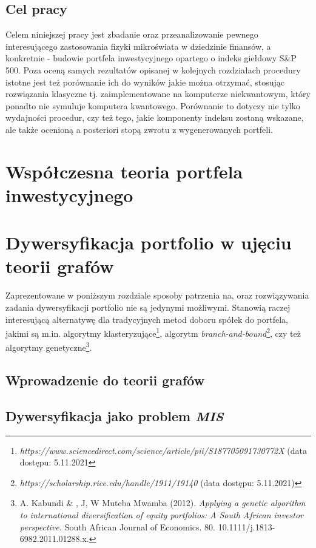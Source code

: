 \documentclass[12pt,a4paper,twoside,openany]{book}
\begin{document}
\section{Cel pracy}
Celem niniejszej pracy jest zbadanie oraz przeanalizowanie pewnego interesującego zastosowania fizyki mikroświata w dziedzinie finansów, a konkretnie - budowie portfela inwestycyjnego opartego o indeks giełdowy S\&P 500. Poza oceną samych rezultatów opisanej w kolejnych rozdziałach procedury istotne jest też porównanie ich do wyników jakie można otrzymać, stosując rozwiązania klasyczne tj. zaimplementowane na komputerze niekwantowym, który ponadto nie symuluje komputera kwantowego. Porównanie to dotyczy nie tylko wydajności procedur, czy też tego, jakie komponenty indeksu zostaną wskazane, ale także ocenioną a posteriori stopą zwrotu z wygenerowanych portfeli.

\chapter{Współczesna teoria portfela inwestycyjnego}

\chapter{Dywersyfikacja portfolio w ujęciu teorii grafów}
Zaprezentowane w poniższym rozdziale sposoby patrzenia na, oraz rozwiązywania zadania dywersyfikacji portfolio nie są jedynymi możliwymi. Stanowią raczej interesującą alternatywę dla tradycyjnych metod doboru spółek do portfela, jakimi są m.in. algorytmy klasteryzujące\footnote{\textit{https://www.sciencedirect.com/science/article/pii/S187705091730772X} (data dostępu: 5.11.2021}, algorytm \textit{branch-and-bound}\footnote{\textit{https://scholarship.rice.edu/handle/1911/19140} (data dostępu: 5.11.2021)}, czy też algorytmy genetyczne\footnote{A. Kabundi \& , J, W Muteba Mwamba (2012). \textit{Applying a genetic algorithm to international diversification of equity portfolios: A South African investor perspective.} South African Journal of Economics. 80. 10.1111/j.1813-6982.2011.01288.x.}.

\section{Wprowadzenie do teorii grafów}

\section{Dywersyfikacja jako problem \textit{MIS}}
\end{document}
